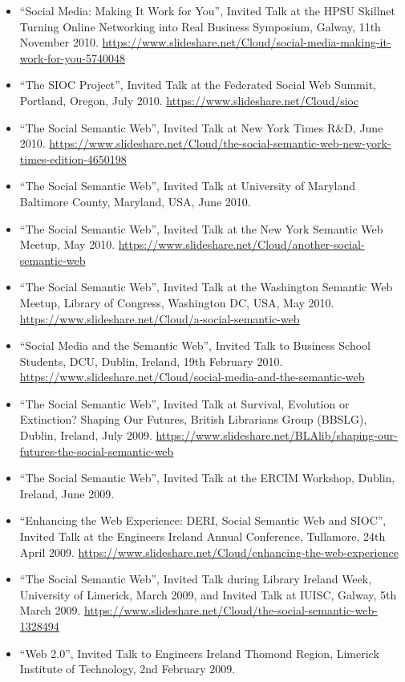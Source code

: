 \documentclass[10pt,a4paper]{res} %
\begin{document}
\begin{resume}
\begin{itemize}
\item ``Social Media: Making It Work for You'', Invited Talk at the HPSU Skillnet Turning Online Networking into Real Business Symposium, Galway, 11th November 2010. \url{https://www.slideshare.net/Cloud/social-media-making-it-work-for-you-5740048}
\item ``The SIOC Project'', Invited Talk at the Federated Social Web Summit, Portland, Oregon, July 2010. \url{https://www.slideshare.net/Cloud/sioc}
\item ``The Social Semantic Web'', Invited Talk at New York Times R\&D, June 2010. \url{https://www.slideshare.net/Cloud/the-social-semantic-web-new-york-times-edition-4650198}
\item ``The Social Semantic Web'', Invited Talk at University of Maryland Baltimore County, Maryland, USA, June 2010. %
\item ``The Social Semantic Web'', Invited Talk at the New York Semantic Web Meetup, May 2010. \url{https://www.slideshare.net/Cloud/another-social-semantic-web}
\item ``The Social Semantic Web'', Invited Talk at the Washington Semantic Web Meetup, Library of Congress, Washington DC, USA, May 2010. \url{https://www.slideshare.net/Cloud/a-social-semantic-web}
\item ``Social Media and the Semantic Web'', Invited Talk to Business School Students, DCU, Dublin, Ireland, 19th February 2010. \url{https://www.slideshare.net/Cloud/social-media-and-the-semantic-web}
\item ``The Social Semantic Web'', Invited Talk at Survival, Evolution or Extinction? Shaping Our Futures, British Librarians Group (BBSLG), Dublin, Ireland, July 2009. \url{https://www.slideshare.net/BLAlib/shaping-our-futures-the-social-semantic-web}
\item ``The Social Semantic Web'', Invited Talk at the ERCIM Workshop, Dublin, Ireland, June 2009. %
\item ``Enhancing the Web Experience: DERI, Social Semantic Web and SIOC'', Invited Talk at the Engineers Ireland Annual Conference, Tullamore, 24th April 2009. \url{https://www.slideshare.net/Cloud/enhancing-the-web-experience}
\item ``The Social Semantic Web'', Invited Talk during Library Ireland Week, University of Limerick, March 2009, and Invited Talk at IUISC, Galway, 5th March 2009. \url{https://www.slideshare.net/Cloud/the-social-semantic-web-1328494}
\item ``Web 2.0'', Invited Talk to Engineers Ireland Thomond Region, Limerick Institute of Technology, 2nd February 2009. %

\end{itemize}
\end{resume}
\end{document}
